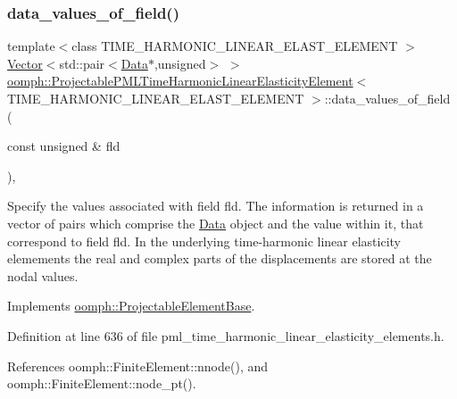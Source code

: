 \subsubsection{\texorpdfstring{data\+\_\+values\+\_\+of\+\_\+field()}{data\_values\_of\_field()}}
{\footnotesize\ttfamily template$<$class T\+I\+M\+E\+\_\+\+H\+A\+R\+M\+O\+N\+I\+C\+\_\+\+L\+I\+N\+E\+A\+R\+\_\+\+E\+L\+A\+S\+T\+\_\+\+E\+L\+E\+M\+E\+NT $>$ \\
\hyperlink{classoomph_1_1Vector}{Vector}$<$std\+::pair$<$\hyperlink{classoomph_1_1Data}{Data}$\ast$,unsigned$>$ $>$ \hyperlink{classoomph_1_1ProjectablePMLTimeHarmonicLinearElasticityElement}{oomph\+::\+Projectable\+P\+M\+L\+Time\+Harmonic\+Linear\+Elasticity\+Element}$<$ T\+I\+M\+E\+\_\+\+H\+A\+R\+M\+O\+N\+I\+C\+\_\+\+L\+I\+N\+E\+A\+R\+\_\+\+E\+L\+A\+S\+T\+\_\+\+E\+L\+E\+M\+E\+NT $>$\+::data\+\_\+values\+\_\+of\+\_\+field (\begin{DoxyParamCaption}\item[{const unsigned \&}]{fld }\end{DoxyParamCaption})\hspace{0.3cm}{\ttfamily [inline]}, {\ttfamily [virtual]}}



Specify the values associated with field fld. The information is returned in a vector of pairs which comprise the \hyperlink{classoomph_1_1Data}{Data} object and the value within it, that correspond to field fld. In the underlying time-\/harmonic linear elasticity elemements the real and complex parts of the displacements are stored at the nodal values. 



Implements \hyperlink{classoomph_1_1ProjectableElementBase_a644306ebdf16f334344c2d27d72f18b7}{oomph\+::\+Projectable\+Element\+Base}.



Definition at line 636 of file pml\+\_\+time\+\_\+harmonic\+\_\+linear\+\_\+elasticity\+\_\+elements.\+h.



References oomph\+::\+Finite\+Element\+::nnode(), and oomph\+::\+Finite\+Element\+::node\+\_\+pt().

\mbox{\label{classoomph_1_1ProjectablePMLTimeHarmonicLinearElasticityElement_a3b6f5752dac14debbbbe757d1a10ba97}} 
